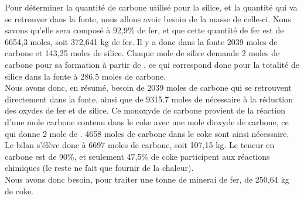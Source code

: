 \documentclass[11pt,a4paper]{report}
\begin{document}
Pour déterminer la quantité de carbone utilisé pour la silice, et la quantité qui va se retrouver dans la fonte, nous allons avoir besoin de la masse de celle-ci. Nous savons qu'elle sera composé à 92,9\% de fer, et que cette quantité de fer est de 6654,3 moles, soit 372,641 kg de fer. Il y a donc dans la fonte 2039 moles de carbone et 143,25 moles de silice. Chaque mole de silice demande 2 moles de carbone pour sa formation à partir de , ce qui correspond donc pour la totalité de silice dans la fonte à 286,5 moles de carbone.\\

Nous avons donc, en résumé, besoin de 2039 moles de carbone qui se retrouvent directement dans la fonte, ainsi que de 9315.7 moles de  nécessaire à la réduction des oxydes de fer et de silice. Ce monoxyde de carbone provient de la réaction d'une mole carbone contenu dans le coke avec une mole dioxyde de carbone, ce qui donne 2 mole de . 4658 moles de carbone dans le coke sont ainsi nécessaire. Le bilan s'élève donc à 6697 moles de carbone, soit 107,15 kg. Le teneur en carbone est de 90\%, et seulement  47,5\% de coke participent aux réactions chimiques (le reste ne fait que fournir de la chaleur). \\

Nous avons donc besoin, pour traiter une tonne de minerai de fer, de 250,64 kg de coke.


 
\end{document}
